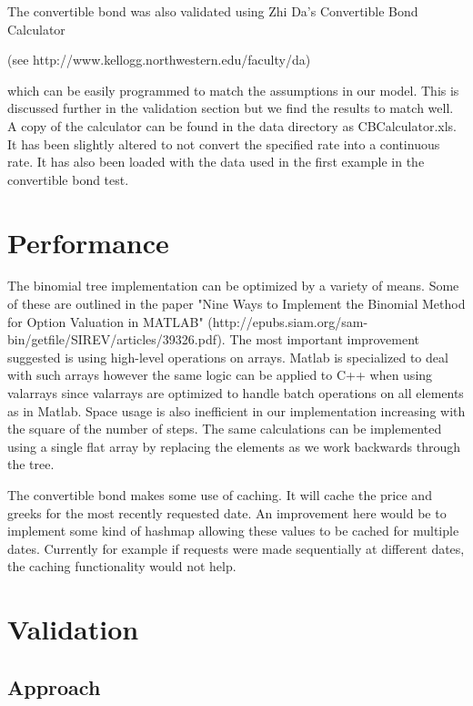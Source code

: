 The convertible bond was also validated using Zhi Da's Convertible
Bond Calculator

(see http://www.kellogg.northwestern.edu/faculty/da)

which can be easily programmed to match the assumptions in our
model.  This is discussed further in the validation section but we
find the results to match well.  A copy of the calculator can be
found in the data directory as CBCalculator.xls.  It has been
slightly altered to not convert the specified rate into a continuous
rate.  It has also been loaded with the data used in the first
example in the convertible bond test.

\section{Performance}

The binomial tree implementation can be optimized by a variety of
means.  Some of these are outlined in the paper "Nine Ways to
Implement the Binomial Method for Option Valuation in MATLAB"
(http://epubs.siam.org/sam-bin/getfile/SIREV/articles/39326.pdf).
The most important improvement suggested is using high-level
operations on arrays.  Matlab is specialized to deal with such
arrays however the same logic can be applied to C++ when using
valarrays since valarrays are optimized to handle batch operations
on all elements as in Matlab.  Space usage is also inefficient in
our implementation increasing with the square of the number of
steps.  The same calculations can be implemented using a single flat
array by replacing the elements as we work backwards through the
tree.

The convertible bond makes some use of caching.  It will cache the
price and greeks for the most recently requested date.  An
improvement here would be to implement some kind of hashmap allowing
these values to be cached for multiple dates.  Currently for example
if requests were made sequentially at different dates, the caching
functionality would not help.


\section{Validation}

\subsection{Approach}

